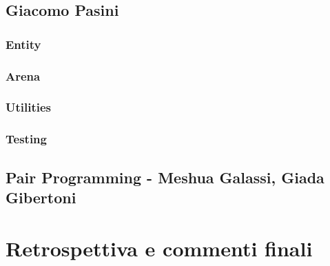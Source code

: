        
        \section{Giacomo Pasini}\label{sec:pasini}
            
            \subsection{Entity}\label{subsec:pasini:entity}
                
            \subsection{Arena}\label{subsec:pasini:arena}
                
            \subsection{Utilities}\label{subsec:pasini:utilities}
                
            \subsection{Testing}\label{subsec:pasini:testing}
                
        
        \section{Pair Programming - Meshua Galassi, Giada Gibertoni}\label{sec:pairprogramming}
            
            
    \clearpage

    \chapter{Retrospettiva e commenti finali}\label{ch:retrospective}
        
        
